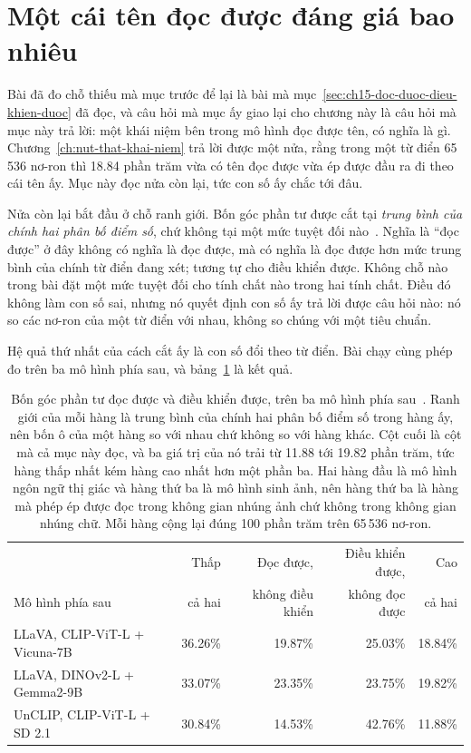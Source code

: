 \section{Một cái tên đọc được đáng giá bao nhiêu}
\label{sec:ch16-mot-cai-ten}

%
Bài đã đo chỗ thiếu mà mục trước để lại là bài mà
mục~\ref{sec:ch15-doc-duoc-dieu-khien-duoc} đã đọc, và câu hỏi mà mục ấy giao
lại cho chương này là câu hỏi mà mục này trả lời: một khái niệm bên trong mô
hình đọc được tên, có nghĩa là gì. Chương~\ref{ch:nut-that-khai-niem} trả lời
được một nửa, rằng trong một từ điển 65\,536 nơ-ron thì 18.84 phần trăm vừa có
tên đọc được vừa ép được đầu ra đi theo cái tên ấy. Mục này đọc nửa còn lại,
tức con số ấy chắc tới đâu.

%
Nửa còn lại bắt đầu ở chỗ ranh giới. Bốn góc phần tư được cắt tại
\emph{trung bình của chính hai phân bố điểm số}, chứ không tại một mức tuyệt đối
nào~\autocite{p32cbmsae}. Nghĩa là \enquote{đọc được} ở đây không có nghĩa là
đọc được, mà có nghĩa là đọc được hơn mức trung bình của chính từ điển đang xét;
tương tự cho điều khiển được. Không chỗ nào trong bài đặt một mức tuyệt đối cho
tính chất nào trong hai tính chất. Điều đó không làm con số sai, nhưng nó quyết
định con số ấy trả lời được câu hỏi nào: nó so các nơ-ron của một từ điển với
nhau, không so chúng với một tiêu chuẩn.

%
Hệ quả thứ nhất của cách cắt ấy là con số đổi theo từ điển. Bài chạy cùng phép
đo trên ba mô hình phía sau, và bảng~\ref{tab:ch16-bon-goc-ba-mo-hinh} là kết
quả.

\begin{table}[htbp]
  \centering
  \caption{Bốn góc phần tư đọc được và điều khiển được, trên ba mô hình phía
  sau~\autocite{p32cbmsae}. Ranh giới của mỗi hàng là trung bình của chính hai
  phân bố điểm số trong hàng ấy, nên bốn ô của một hàng so với nhau chứ không so
  với hàng khác. Cột cuối là cột mà cả mục này đọc, và ba giá trị của nó trải từ
  11.88 tới 19.82 phần trăm, tức hàng thấp nhất kém hàng cao nhất hơn một phần
  ba. Hai hàng đầu là mô hình ngôn ngữ thị giác và hàng thứ ba là mô hình sinh
  ảnh, nên hàng thứ ba là hàng mà phép ép được đọc trong không gian nhúng ảnh
  chứ không trong không gian nhúng chữ. Mỗi hàng cộng lại đúng 100 phần trăm
  trên 65\,536 nơ-ron.}
  \label{tab:ch16-bon-goc-ba-mo-hinh}
  \small
  \begin{tabular}{@{}lrrrr@{}}
    \toprule
    & Thấp & Đọc được, & Điều khiển được, & Cao \\
    Mô hình phía sau & cả hai & không điều khiển & không đọc được & cả hai \\
    \midrule
    LLaVA, CLIP-ViT-L + Vicuna-7B   & 36.26\% & 19.87\% & 25.03\% & 18.84\% \\
    LLaVA, DINOv2-L + Gemma2-9B     & 33.07\% & 23.35\% & 23.75\% & 19.82\% \\
    UnCLIP, CLIP-ViT-L + SD 2.1     & 30.84\% & 14.53\% & 42.76\% & 11.88\% \\
    \bottomrule
  \end{tabular}
\end{table}

